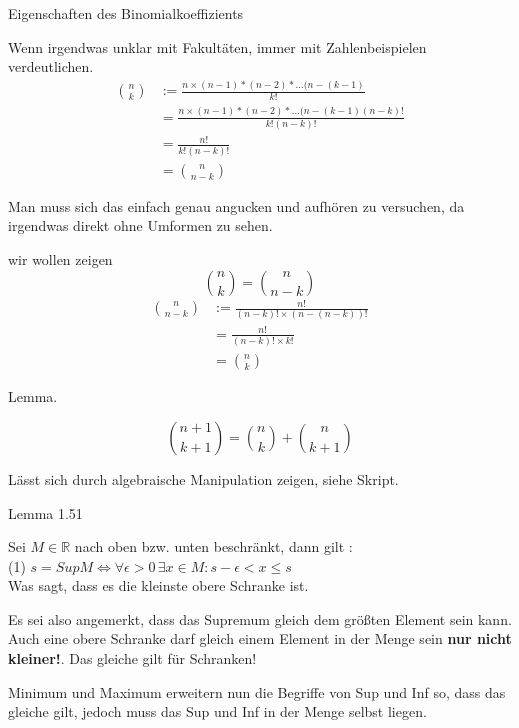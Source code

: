 \documentclass[headsepline,12pt,a4paper]{scrartcl}
\begin{document}
\begin{center}
\item[Eigenschaften des Binomialkoeffizients]
\end{center}
\item Wenn irgendwas unklar mit Fakultäten, immer mit Zahlenbeispielen verdeutlichen.
\begin{equation} 
 \begin{aligned} 
  \binom{n}{k} &:= \frac{n\times (n-1)* (n-2)*...(n-(k-1)}{k!} \\ 
   &= \frac{n\times (n-1)* (n-2)*...(n-(k-1)(n-k)!}{k!(n-k)!} \\
   &= \frac{n!}{k!(n-k)!}  \\
   &= \binom{n}{n-k}
 \end{aligned} 
\end{equation} 
\item Man muss sich das einfach genau angucken und aufhören zu versuchen, da irgendwas direkt ohne Umformen zu sehen.
\item wir wollen zeigen $$ \binom{n}{k} = \binom{n}{n-k} $$
\begin{equation} 
 \begin{aligned} 
  \binom{n}{n-k} &:= \frac{n!}{(n-k)! \times (n-(n-k))!} \\ 
  &= \frac{n!}{(n-k)! \times k!} \\   
   &= \binom{n}{k}
 \end{aligned} 
\end{equation} 

\item Lemma. \\

\item $$ \binom{n+1}{k+1} = \binom{n}{k} + \binom{n}{k+1} $$
\item Lässt sich durch algebraische Manipulation zeigen, siehe Skript.

\begin{center}
\item[Lemma 1.51]
\end{center}
\item Sei $ M \in \mathbb{R} $ nach oben bzw. unten beschränkt, dann gilt :  \\
(1)  $ s = Sup M \Leftrightarrow \forall \epsilon > 0 \, \exists x \in M : s - \epsilon < x \leq s $ \\
Was sagt, dass es die kleinste obere Schranke ist.
\item Es sei also angemerkt, dass das Supremum gleich dem größten Element sein kann. Auch eine obere Schranke darf gleich einem Element in der Menge sein \textbf{nur nicht kleiner!}. Das gleiche gilt für Schranken! 
\item Minimum und Maximum erweitern nun die Begriffe von Sup und Inf so, dass das gleiche gilt, jedoch muss das Sup und Inf in der Menge selbst liegen.
\end{document}

